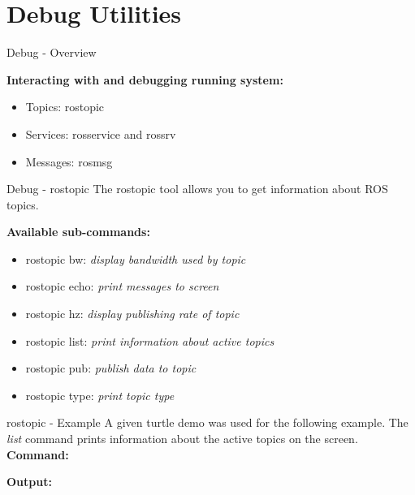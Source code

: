 \documentclass{beamer}
\begin{document}
\section{Debug Utilities}
\begin{frame}{Debug - Overview}
	\begin{large}\textbf{Interacting with and debugging running system:}\end{large}
	\begin{itemize}
		\item Topics: 							rostopic
		\item Services:							rosservice and rossrv
		\item Messages:							rosmsg
	\end{itemize}
\end{frame}
\begin{frame}{Debug - rostopic}
The rostopic tool allows you to get information about ROS topics.
\newline
\newline
\begin{large}\textbf{Available sub-commands:}\end{large}
\begin{itemize}
	\item rostopic bw:     \textit{display bandwidth used by topic}
	\item rostopic echo:   \textit{print messages to screen}
	\item rostopic hz:     \textit{display publishing rate of topic}    
	\item rostopic list:   \textit{print information about active topics}
	\item rostopic pub:    \textit{publish data to topic}
	\item rostopic type:   \textit{print topic type}
\end{itemize}
\end{frame}
\begin{frame}{rostopic - Example}
A given turtle demo was used for the following example.
\newline
The \textit{list} command prints information about the active topics on the screen.
\newline
\textbf{Command:} 



\textbf{Output:}


\end{frame}
\end{document}
